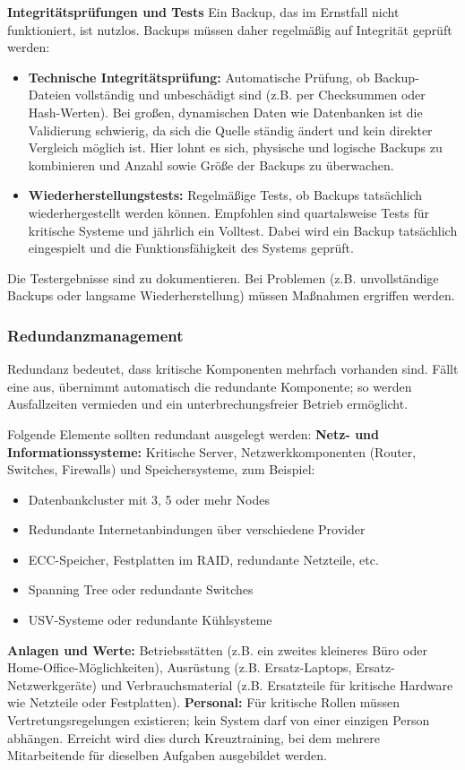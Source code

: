 \textbf{Integritätsprüfungen und Tests}
Ein Backup, das im Ernstfall nicht funktioniert, ist nutzlos. Backups müssen daher regelmäßig auf Integrität geprüft werden:
\begin{itemize}
    \item \textbf{Technische Integritätsprüfung:} Automatische Prüfung, ob Backup-Dateien vollständig und unbeschädigt sind (z.B. per Checksummen oder Hash-Werten). Bei großen, dynamischen Daten wie Datenbanken ist die Validierung schwierig, da sich die Quelle ständig ändert und kein direkter Vergleich möglich ist. Hier lohnt es sich, physische und logische Backups zu kombinieren und Anzahl sowie Größe der Backups zu überwachen.
    \item \textbf{Wiederherstellungstests:} Regelmäßige Tests, ob Backups tatsächlich wiederhergestellt werden können. Empfohlen sind quartalsweise Tests für kritische Systeme und jährlich ein Volltest. Dabei wird ein Backup tatsächlich eingespielt und die Funktionsfähigkeit des Systems geprüft.
\end{itemize}
Die Testergebnisse sind zu dokumentieren. Bei Problemen (z.B. unvollständige Backups oder langsame Wiederherstellung) müssen Maßnahmen ergriffen werden.

\newpage
\subsubsection{Redundanzmanagement}
Redundanz bedeutet, dass kritische Komponenten mehrfach vorhanden sind. Fällt eine aus, übernimmt automatisch die redundante Komponente; so werden Ausfallzeiten vermieden und ein unterbrechungsfreier Betrieb ermöglicht.

Folgende Elemente sollten redundant ausgelegt werden:
\textbf{Netz- und Informationssysteme:} Kritische Server, Netzwerkkomponenten (Router, Switches, Firewalls) und Speichersysteme, zum Beispiel:
\begin{itemize}
    \item Datenbankcluster mit 3, 5 oder mehr Nodes
    \item Redundante Internetanbindungen über verschiedene Provider
    \item ECC-Speicher, Festplatten im RAID, redundante Netzteile, etc.
    \item Spanning Tree oder redundante Switches
    \item USV-Systeme oder redundante Kühlsysteme
\end{itemize}

\textbf{Anlagen und Werte:} Betriebsstätten (z.B. ein zweites kleineres Büro oder Home-Office-Möglichkeiten), Ausrüstung (z.B. Ersatz-Laptops, Ersatz-Netzwerkgeräte) und Verbrauchsmaterial (z.B. Ersatzteile für kritische Hardware wie Netzteile oder Festplatten).
\textbf{Personal:} Für kritische Rollen müssen Vertretungsregelungen existieren; kein System darf von einer einzigen Person abhängen. Erreicht wird dies durch Kreuztraining, bei dem mehrere Mitarbeitende für dieselben Aufgaben ausgebildet werden.

